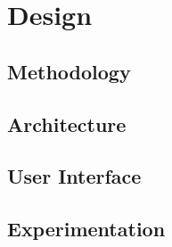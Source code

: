 \chapter{Design}
\section{Methodology}
\section{Architecture}
\section{User Interface}
\section{Experimentation}